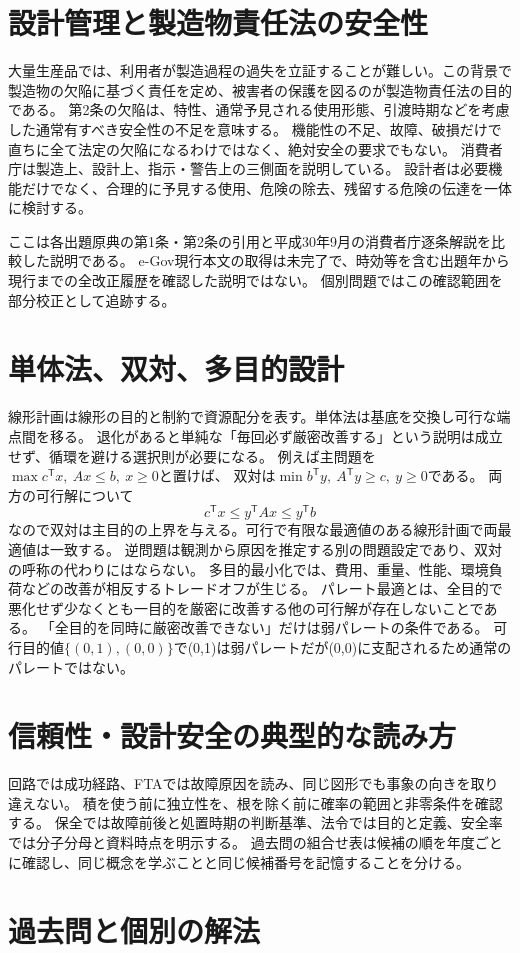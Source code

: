 \section{設計管理と製造物責任法の安全性}
\label{theory:dependability:liability}
大量生産品では、利用者が製造過程の過失を立証することが難しい。この背景で製造物の欠陥に基づく責任を定め、被害者の保護を図るのが製造物責任法の目的である。
第2条の欠陥は、特性、通常予見される使用形態、引渡時期などを考慮した通常有すべき安全性の不足を意味する。
機能性の不足、故障、破損だけで直ちに全て法定の欠陥になるわけではなく、絶対安全の要求でもない。
消費者庁は製造上、設計上、指示・警告上の三側面を説明している。\cite{design_caa_pl1,design_caa_pl2}
設計者は必要機能だけでなく、合理的に予見する使用、危険の除去、残留する危険の伝達を一体に検討する。
\begin{tcolorbox}[title=確認した法令時点]
ここは各出題原典の第1条・第2条の引用と平成30年9月の消費者庁逐条解説を比較した説明である。
e-Gov現行本文の取得は未完了で、時効等を含む出題年から現行までの全改正履歴を確認した説明ではない。
個別問題ではこの確認範囲を部分校正として追跡する。
\end{tcolorbox}

\section{単体法、双対、多目的設計}
\label{theory:dependability:optimization}
線形計画は線形の目的と制約で資源配分を表す。単体法は基底を交換し可行な端点間を移る。
退化があると単純な「毎回必ず厳密改善する」という説明は成立せず、循環を避ける選択則が必要になる。
例えば主問題を\(\max c^{\mathsf T}x,\ Ax\le b,\ x\ge0\)と置けば、
双対は\(\min b^{\mathsf T}y,\ A^{\mathsf T}y\ge c,\ y\ge0\)である。
両方の可行解について
\[
 c^{\mathsf T}x\le y^{\mathsf T}Ax\le y^{\mathsf T}b
\]
なので双対は主目的の上界を与える。可行で有限な最適値のある線形計画で両最適値は一致する。\cite{design_mit_lp}
逆問題は観測から原因を推定する別の問題設定であり、双対の呼称の代わりにはならない。
多目的最小化では、費用、重量、性能、環境負荷などの改善が相反するトレードオフが生じる。
パレート最適とは、全目的で悪化せず少なくとも一目的を厳密に改善する他の可行解が存在しないことである。
「全目的を同時に厳密改善できない」だけは弱パレートの条件である。
可行目的値\(\{(0,1),(0,0)\}\)で(0,1)は弱パレートだが(0,0)に支配されるため通常のパレートではない。

\section{信頼性・設計安全の典型的な読み方}
回路では成功経路、FTAでは故障原因を読み、同じ図形でも事象の向きを取り違えない。
積を使う前に独立性を、根を除く前に確率の範囲と非零条件を確認する。
保全では故障前後と処置時期の判断基準、法令では目的と定義、安全率では分子分母と資料時点を明示する。
過去問の組合せ表は候補の順を年度ごとに確認し、同じ概念を学ぶことと同じ候補番号を記憶することを分ける。





\section{過去問と個別の解法}




